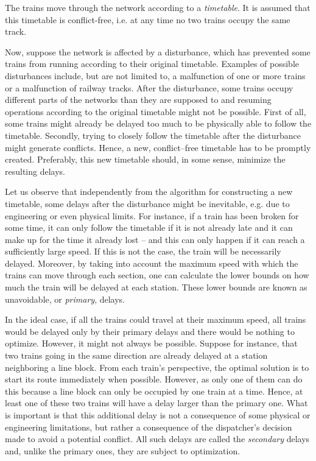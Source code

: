 The trains move through the network according to a \emph{timetable}. It is
assumed that this timetable is conflict-free, i.e. at any time no two trains
occupy the same track.

Now, suppose the network is affected by a disturbance, which has prevented some
trains from running according to their original timetable. Examples of possible
disturbances include, but are not limited to, a malfunction of one or more
trains or a malfunction of railway tracks. After the disturbance, some trains
occupy different parts of the networks than they are supposed to and resuming
operations according to the original timetable might not be possible. First of
all, some trains might already be delayed too much to be physically able to
follow the timetable. Secondly, trying to closely follow the timetable after
the disturbance might generate conflicts. Hence, a new, conflict--free
timetable has to be promptly created. Preferably, this new timetable should, in
some sense, minimize the resulting delays.

Let us observe that independently from the algorithm for constructing a new
timetable, some delays after the disturbance might be inevitable, e.g. due to
engineering or even physical limits. For instance, if a train has been broken
for some time, it can only follow the timetable if it is not already late and
it can make up for the time it already lost -- and this can only happen if it
can reach a sufficiently large speed. If this is not the case, the train will
be necessarily delayed. Moreover, by taking into account the maximum speed with
which the trains can move through each section, one can calculate the lower
bounds on how much the train will be delayed at each station. These lower
bounds are known as unavoidable, or \emph{primary}, delays.

In the ideal case, if all the trains could travel at their maximum speed, all
trains would be delayed only by their primary delays and there would be nothing
to optimize. However, it might not always be possible. Suppose for instance,
that two trains going in the same direction are already delayed at a station
neighboring a line block. From each train's perspective, the optimal solution
is to start its route immediately when possible. However, as only one of them
can do this because a line block can only be occupied by one train at a time.
Hence, at least one of these two trains will have a delay larger than the
primary one. What is important is that this additional delay is not a
consequence of some physical or engineering limitations, but rather a
consequence of the dispatcher's decision made to avoid a potential conflict.
All such delays are called the \emph{secondary} delays and, unlike the primary
ones, they are subject to optimization.

